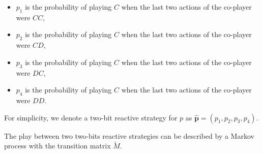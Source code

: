 \documentclass{article}
\theoremstyle{definition}
\begin{document}
\begin{itemize}
  \item \(p_1\) is the probability of playing \(C\) when the last two actions of the co-player were \(CC\),
  \item \(p_2\) is the probability of playing \(C\) when the last two actions of the co-player were \(CD\),
  \item \(p_3\) is the probability of playing \(C\) when the last two actions of the co-player were \(DC\),
  \item \(p_4\) is the probability of playing \(C\) when the last two actions of the co-player were \(DD\).
\end{itemize}

For simplicity, we denote a two-bit reactive strategy for \(p\) as
\(\mathbf{\hat{p}} = (p_1, p_2, p_3, p_4)\).

The play between two two-bits reactive strategies can be described by a Markov
process with the transition matrix \(\tilde{M}\).
\end{document}
